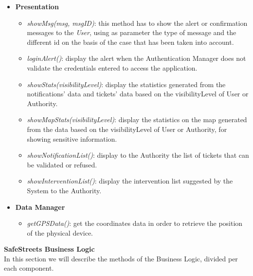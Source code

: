 \documentclass{article}
\begin{document}
	\begin{itemize}
		\item {\bf Presentation}
		\begin{itemize}
		\item {\it showMsg(msg, msgID)}: this method has to show the alert or confirmation messages to the {\it User}, using as parameter the type of message and the different id on the basis of the case that has been taken into account. 
		\item {\it loginAlert()}: display the alert when the Authentication Manager does not validate the credentials entered to access the application.
		\item {\it showStats(visibilityLevel)}: display the statistics generated from the notifications' data and tickets' data based on the visibilityLevel of User or Authority.
		\item {\it showMapStats(visibilityLevel)}: display the statistics on the map generated from the data based on the visibilityLevel of User or Authority, for showing sensitive information.
		\item {\it showNotificationList()}: display to the Authority the list of tickets that can be validated or refused.
		\item {\it showInterventionList()}: display the intervention list suggested by the System to the Authority.
		\end{itemize} 
		\item {\bf Data Manager}
		\begin{itemize}
		\item {\it getGPSData()}: get the coordinates data in order to retrieve the position of the physical device.
		\end{itemize}
	\end{itemize} 
	{\bf SafeStreets Business Logic} \\
	In this section we will describe the methods of the Business Logic, divided per each component.
\end{document}

